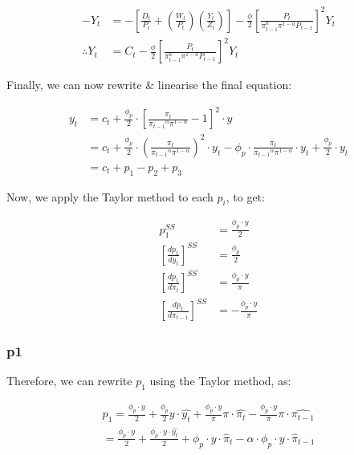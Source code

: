 \documentclass[11pt,preprint, authoryear]{elsarticle}
\numberwithin{equation}{section}
\numberwithin{figure}{section}
\numberwithin{table}{section}
\begin{document}
\[\begin{aligned} -Y_t  &= -\left[ \frac{D_t}{P_t} + (\frac{W_t}{P_t})(\frac{Y_t}{Z_t}) \right] - \frac{\phi}{2}[\frac{P_t}{\pi_{t-1}^a \pi^{1-a}P_{t-1}}]^2Y_t \\
\therefore Y_t & = C_t - \frac{\phi}{2}[\frac{P_t}{\pi_{t-1}^a \pi^{1-a}P_{t-1}}]^2Y_t
\end{aligned}\]

Finally, we can now rewrite \& linearise the final equation:

\[\begin{aligned}
y_{t} &= c_t + \frac{\phi_{p}}{2} \cdot \left[ \frac{\pi_{t}}{{\pi_{t-1}}^{\alpha} \pi^{1-\alpha}} -1 \right]^{2} \cdot y\\
&=c_{t} + \frac{\phi_{p}}{2} \cdot \left(\frac{\pi_{t}}{{\pi_{t-1}}^{\alpha} \pi^{1-\alpha}} \right)^2 \cdot y_{t} - \phi_{p} \cdot
\frac{\pi_{t}}{{\pi_{t-1}}^{\alpha} \pi^{1-\alpha}} \cdot y_{t} + \frac{\phi_{p}}{2} \cdot y_{t}\\
&= c_t + p_{1} - p_{2} + p_{3}
\end{aligned}\]

Now, we apply the Taylor method to each \(p_{i}\), to get:

\[\begin{aligned}
p_{1}^{SS}&=\frac{\phi_{p} \cdot y}{2}\\\left[\frac{dp_{1}}{dy_{t}} \right]^{SS} &= \frac{\phi_{p}}{2}\\\left[\frac{dp_{1}}{d\pi_{t}} \right]^{SS} &= \frac{\phi_{p} \cdot y}{\pi}\\\left[\frac{dp_{1}}{d\pi_{t-1}} \right]^{SS} &= - \frac{\phi_{p} \cdot y}{\pi}
\end{aligned}\]

\hypertarget{p1}{%
\subsubsection{p1}\label{p1}}

Therefore, we can rewrite \(p_{1}\) using the Taylor method, as:

\[\begin{aligned}
p_{1} = \frac{\phi_{p} \cdot y}{2} + \frac{\phi_{p}}{2} y \cdot \hat{y_{t}} + \frac{\phi_{p} \cdot y}{\pi} \pi \cdot \hat{\pi_{t}} - \frac{\phi_{p} \cdot y}{\pi}\pi \cdot \hat{\pi_{t-1}}\\
= \frac{\phi_{p} \cdot y}{2} + \frac{\phi_{p} \cdot y \cdot \hat{y_{t}} }{2} + \phi_{p} \cdot y \cdot \hat{\pi}_{t} - \alpha \cdot \phi_{p} \cdot y \cdot \hat{\pi}_{t-1} \\
\end{aligned}\]
\end{document}

